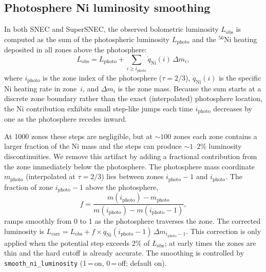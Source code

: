 \documentclass[twocolumn,linenumbers]{aastex701}
\begin{document}
\subsection{Photosphere Ni luminosity smoothing}
\label{sec:ni_smoothing}

In both SNEC and SuperSNEC, the observed bolometric luminosity $L_\mathrm{obs}$ is computed as the sum of the photospheric luminosity $L_\mathrm{photo}$ and the $^{56}$Ni heating deposited in all zones above the photosphere:
\begin{equation}
L_\mathrm{obs} = L_\mathrm{photo} + \sum_{i \ge i_\mathrm{photo}} \dot{q}_\mathrm{Ni}(i)\, \Delta m_i,
\end{equation}
where $i_\mathrm{photo}$ is the zone index of the photosphere ($\tau = 2/3$), $\dot{q}_\mathrm{Ni}(i)$ is the specific Ni heating rate in zone~$i$, and $\Delta m_i$ is the zone mass. Because the sum starts at a discrete zone boundary rather than the exact (interpolated) photosphere location, the Ni contribution exhibits small step-like jumps each time $i_\mathrm{photo}$ decreases by one as the photosphere recedes inward.

At 1000 zones these steps are negligible, but at ${\sim}100$ zones each zone contains a larger fraction of the Ni mass and the steps can produce ${\sim}1$--$2\%$ luminosity discontinuities. We remove this artifact by adding a fractional contribution from the zone immediately below the photosphere. The photosphere mass coordinate $m_\mathrm{photo}$ (interpolated at $\tau = 2/3$) lies between zones $i_\mathrm{photo}-1$ and $i_\mathrm{photo}$. The fraction of zone $i_\mathrm{photo}-1$ above the photosphere,
\begin{equation}
f = \frac{m(i_\mathrm{photo}) - m_\mathrm{photo}}{m(i_\mathrm{photo}) - m(i_\mathrm{photo}-1)},
\end{equation}
ramps smoothly from 0 to 1 as the photosphere traverses the zone. The corrected luminosity is $L_\mathrm{corr} = L_\mathrm{obs} + f \times \dot{q}_\mathrm{Ni}(i_\mathrm{photo}-1)\,\Delta m_{i_\mathrm{photo}-1}$. This correction is only applied when the potential step exceeds 2\% of $L_\mathrm{obs}$; at early times the zones are thin and the hard cutoff is already accurate. The smoothing is controlled by \texttt{smooth\_ni\_\-luminosity} (1\,=\,on, 0\,=\,off; default on).
\end{document}
